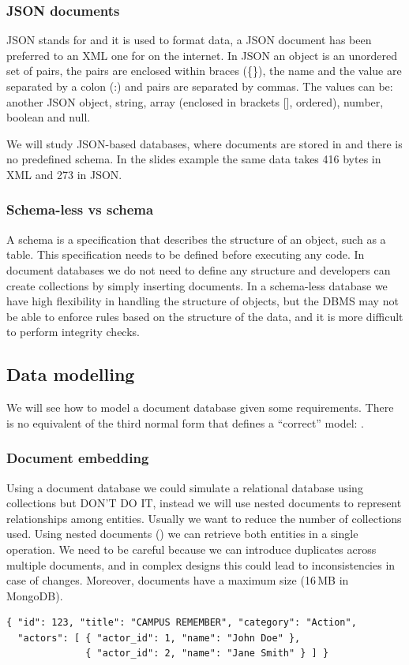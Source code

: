\subsubsection{JSON documents}
JSON stands for  and it is used to format data, a JSON document has been preferred to an XML one for  on the internet. In JSON an object is an unordered set of  pairs, the pairs are enclosed within braces (\{\}), the name and the value are separated by a colon (:) and pairs are separated by commas. The values can be: another JSON object, string, array (enclosed in brackets [], ordered), number, boolean and null.

We will study JSON-based databases, where documents are stored in  and there is no predefined schema. In the slides example the same data takes 416 bytes in XML and 273 in JSON.

\subsubsection{Schema-less vs schema}
A schema is a specification that describes the structure of an object, such as a table. This specification needs to be defined before executing any code. In document databases we do not need to define any structure and developers can create collections by simply inserting documents. In a schema-less database we have high flexibility in handling the structure of objects, but the DBMS may not be able to enforce rules based on the structure of the data, and it is more difficult to perform integrity checks.

\subsection{Data modelling}
We will see how to model a document database given some requirements. There is no equivalent of the third normal form that defines a ``correct'' model: .

\subsubsection{Document embedding}
Using a document database we could simulate a relational database using collections but DON'T DO IT, instead we will use nested documents to represent relationships among entities. Usually we want to reduce the number of collections used. Using nested documents () we can retrieve both entities in a single operation. We need to be careful because we can introduce duplicates across multiple documents, and in complex designs this could lead to inconsistencies in case of changes. Moreover, documents have a maximum size (16\,MB in MongoDB).
\begin{lstlisting}
{ "id": 123, "title": "CAMPUS REMEMBER", "category": "Action",
  "actors": [ { "actor_id": 1, "name": "John Doe" },
              { "actor_id": 2, "name": "Jane Smith" } ] }
\end{lstlisting}

